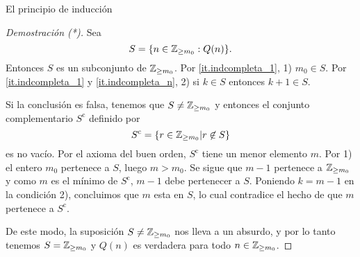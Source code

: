 \begin{section}{El principio de inducción}
\begin{proof}[Demostración (*)]
        Sea 
        \begin{equation*}
            S = \{n\in {\mathbb Z}_{\ge m_0}: Q(n)\}.
        \end{equation*}
        Entonces $S$ es un subconjunto de ${\mathbb Z}_{\ge m_0}$. Por  \ref{it.indcompleta_1}, 1) $m_0 \in S$. Por \ref{it.indcompleta_1} y \ref{it.indcompleta_n}, 2) si $ k \in S$ entonces $k+1\in S$.  
    
        Si la conclusión es falsa, tenemos que $S \not= {\mathbb Z}_{\ge m_0}$ y entonces
        el conjunto complementario $S^{\text{c}}$ definido por
        $$
        S^{\text{c}}= \{ r \in {\mathbb Z}_{\ge m_0}| r\not\in S\}
        $$
        es no vacío. Por el axioma del buen orden, $S^{\text{c}}$ tiene un menor elemento $m$. Por 1) el entero $m_0$ pertenece a $S$, luego $m> m_0$. Se sigue que $m-1$ pertenece a ${\mathbb Z}_{\ge m_0}$ y como $m$ es el mínimo de $S^{\text{c}}$, $m-1$ debe pertenecer a $S$. Poniendo $k=m-1$ en la condición 2), concluimos que $m$ esta en $S$, lo cual contradice el hecho de que $m$ pertenece a $S^{\text{c}}$. 
        
        De este modo, la suposición $S \not={\mathbb Z}_{\ge m_0}$ nos lleva a un absurdo, y por lo tanto tenemos $S= {\mathbb Z}_{\ge m_0}$ y $Q(n)$ es verdadera para todo $n \in {\mathbb Z}_{\ge m_0}$.
    \end{proof}
    

\begin{comment}
\begin{teorema}[Principio de inducción completa] Supongamos que $n_0$ es cualquier entero (no necesariamente positivo), y sea $\Z_{\ge n_0}$ el conjunto de enteros $n$ tal que $ n \ge n_0$. Sea $S$ un subconjunto de  $\Z_{\ge n_0}$ que satisface las condiciones: \index{principio de inducción completa}
\begin{enumerate}[label=\textit{\alph*)}]
\item\label{it.indcompleta_1} $n_0 \in S$,
\item\label{it.indcompleta_n} si $h\in S$ para todo $h$ en el rango $n_0 \le h \le k$ entonces $k+1 \in S$.
\end{enumerate}
Entonces se sigue que $S= \Z_{\ge n_0}$.
\end{teorema}
\begin{proof}[Demostración (*)]
Si la conclusión es falsa, $S \not=  \Z_{\ge n_0}$ y el conjunto complementario (en $X$)  $S^{\text{c}}$ definido por
$$
S^{\text{c}}= \{ r \in  \Z_{\ge n_0} | r\not\in S\}
$$
es no vacío. Como $ \Z_{\ge n_0}$ es un conjunto acotado inferiormente por $n_0$, por el axioma del buen orden, $S^{\text{c}}$ tiene un menor elemento $m$. Como $n_0$ pertenece a $S$, $m\not=n_0$. Se sigue que $m-1$ pertenece a $X$ y como $m$ es el mínimo de $S^{\text{c}}$, $m-1$ debe pertenecer a $S$. Poniendo $k=m-1$ en la condición \ref{it.indcompleta_n}, concluimos que $m$ esta en $S$, lo cual contradice el hecho de que $m$ pertenece a $S^{\text{c}}$. De este modo, la suposición $S \not=  \Z_{\ge n_0}$ nos lleva a un absurdo, y por lo tanto tenemos $S=  \Z_{\ge n_0}$.
\end{proof}
\end{comment}


\end{section}
